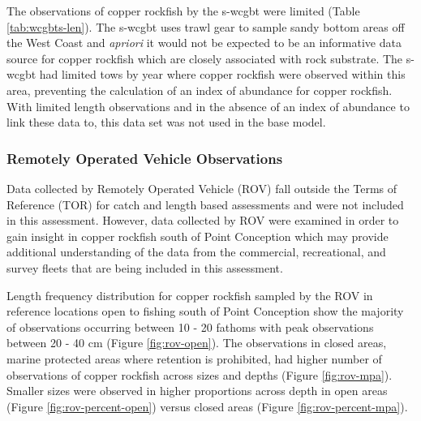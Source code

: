 \documentclass[11pt,
  english,
  a4paper,
]{article}
\begin{document}

The observations of copper rockfish by the \gls{s-wcgbt} were limited (Table \ref{tab:wcgbts-len}). The \gls{s-wcgbt} uses trawl gear to sample sandy bottom areas off the West Coast and \emph{apriori} it would not be expected to be an informative data source for copper rockfish which are closely associated with rock substrate. The \gls{s-wcgbt} had limited tows by year where copper rockfish were observed within this area, preventing the calculation of an index of abundance for copper rockfish. With limited length observations and in the absence of an index of abundance to link these data to, this data set was not used in the base model.

\leavevmode\tagmcend\tagstructend\par


\hypertarget{remotely-operated-vehicle-observations}{%
\subsubsection{Remotely Operated Vehicle Observations}\label{remotely-operated-vehicle-observations}}

\leavevmode\tagmcend\tagstructend


Data collected by Remotely Operated Vehicle (ROV) fall outside the Terms of Reference (TOR) for catch and length based assessments and were not included in this assessment. However, data collected by ROV were examined in order to gain insight in copper rockfish south of Point Conception which may provide additional understanding of the data from the commercial, recreational, and survey fleets that are being included in this assessment.

\leavevmode\tagmcend\tagstructend\par


Length frequency distribution for copper rockfish sampled by the ROV in reference locations open to fishing south of Point Conception show the majority of observations occurring between 10 - 20 fathoms with peak observations between 20 - 40 cm (Figure \ref{fig:rov-open}). The observations in closed areas, marine protected areas where retention is prohibited, had higher number of observations of copper rockfish across sizes and depths (Figure \ref{fig:rov-mpa}). Smaller sizes were observed in higher proportions across depth in open areas (Figure \ref{fig:rov-percent-open}) versus closed areas (Figure \ref{fig:rov-percent-mpa}).
\end{document}

